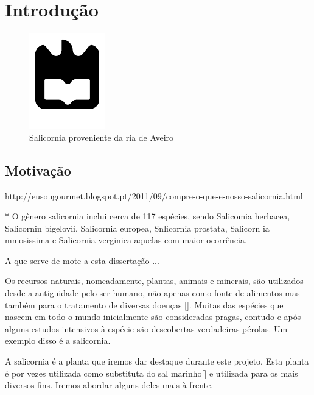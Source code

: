 \chapter{Introdução}




\begin{figure}[!htb]
\centering
\includegraphics{uaLogoNew.pdf}
\caption{Salicornia proveniente da ria de Aveiro}
\label{Rotulo}
\end{figure}



\section{Motivação}




http://eusougourmet.blogspot.pt/2011/09/compre-o-que-e-nosso-salicornia.html




* O gênero salicornia inclui cerca de 117 espécies, sendo Salicomia herbacea, Salicornin bigelovii, Salicornia europea, Snlicornia prostata, Salicorn ia mmosissima e Salicornia verginica aquelas com maior ocorrência. \cite{overviewsal}

A que serve de mote a esta dissertação ...




Os recursos naturais, nomeadamente, plantas, animais e minerais, são utilizados desde a antiguidade pelo ser humano, não apenas como fonte de alimentos mas também para o tratamento de diversas doenças []. Muitas das espécies que nascem em todo o mundo inicialmente são consideradas pragas, contudo e após alguns estudos intensivos à espécie são descobertas verdadeiras pérolas. Um exemplo disso é a salicornia.

A salicornia é a planta que iremos dar destaque durante este projeto. Esta planta é por vezes utilizada como substituta do sal marinho[] e utilizada para os mais diversos fins. Iremos abordar alguns deles mais à frente. 

